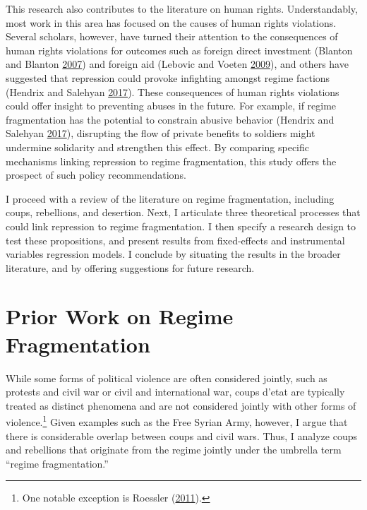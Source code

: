 \documentclass[12pt,]{article}
\let\rmarkdownfootnote\footnote%
\def\footnote{\protect\rmarkdownfootnote}
\theoremstyle{definition}
\theoremstyle{definition}
\theoremstyle{definition}
\theoremstyle{remark}
\begin{document}
This research also contributes to the literature on human rights.
Understandably, most work in this area has focused on the causes of
human rights violations. Several scholars, however, have turned their
attention to the consequences of human rights violations for outcomes
such as foreign direct investment (Blanton and Blanton
\protect\hyperlink{ref-Blanton2007}{2007}) and foreign aid (Lebovic and
Voeten \protect\hyperlink{ref-Lebovic2009}{2009}), and others have
suggested that repression could provoke infighting amongst regime
factions (Hendrix and Salehyan
\protect\hyperlink{ref-Hendrix2017}{2017}). These consequences of human
rights violations could offer insight to preventing abuses in the
future. For example, if regime fragmentation has the potential to
constrain abusive behavior (Hendrix and Salehyan
\protect\hyperlink{ref-Hendrix2017}{2017}), disrupting the flow of
private benefits to soldiers might undermine solidarity and strengthen
this effect. By comparing specific mechanisms linking repression to
regime fragmentation, this study offers the prospect of such policy
recommendations.

I proceed with a review of the literature on regime fragmentation,
including coups, rebellions, and desertion. Next, I articulate three
theoretical processes that could link repression to regime
fragmentation. I then specify a research design to test these
propositions, and present results from fixed-effects and instrumental
variables regression models. I conclude by situating the results in the
broader literature, and by offering suggestions for future research.

\hypertarget{prior-work-on-regime-fragmentation}{%
\section{Prior Work on Regime
Fragmentation}\label{prior-work-on-regime-fragmentation}}

While some forms of political violence are often considered jointly,
such as protests and civil war or civil and international war, coups
d'etat are typically treated as distinct phenomena and are not
considered jointly with other forms of violence.\footnote{One notable
  exception is Roessler (\protect\hyperlink{ref-Roessler2011}{2011}).}
Given examples such as the Free Syrian Army, however, I argue that there
is considerable overlap between coups and civil wars. Thus, I analyze
coups and rebellions that originate from the regime jointly under the
umbrella term ``regime fragmentation.''
\end{document}
